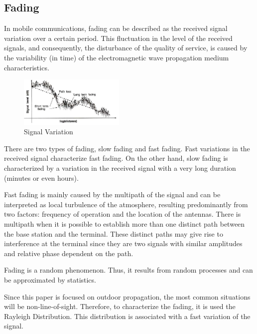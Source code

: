 \documentclass[letterpaper, 10 pt, conference]{ieeeconf}  %
\begin{document}
\subsection{Fading}
In mobile communications, fading can be described as the received signal variation over a certain period. This fluctuation in the level of the received signals, and consequently, the disturbance of the quality of service, is caused by the variability (in time) of the electromagnetic wave propagation medium characteristics.
\begin{figure}[h]
    \centering
    \includegraphics[width=0.45\textwidth]{fading.JPG}
    \caption{Signal Variation}
    \label{fig:fading}
\end{figure}
\par\noindent
There are two types of fading, slow fading and fast fading. Fast variations in the received signal characterize fast fading. On the other hand, slow fading is characterized by a variation in the received signal with a very long duration (minutes or even hours).
\par\noindent Fast fading is mainly caused by the multipath of the signal and can be interpreted as local turbulence of the atmosphere, resulting predominantly from two factors: frequency of operation and the location of the antennas. There is multipath when it is possible to establish more than one distinct path between the base station and the terminal. These distinct paths may give rise to interference at the terminal since they are two signals with similar amplitudes and relative phase dependent on the path.\par\noindent Fading is a random phenomenon. Thus, it results from random processes and can be approximated by statistics.\par\noindent
Since this paper is focused on outdoor propagation, the most common situations will be non-line-of-sight. Therefore, to characterize the fading, it is used the Rayleigh Distribution.  This distribution is associated with a fast variation of the signal. 
\end{document}
